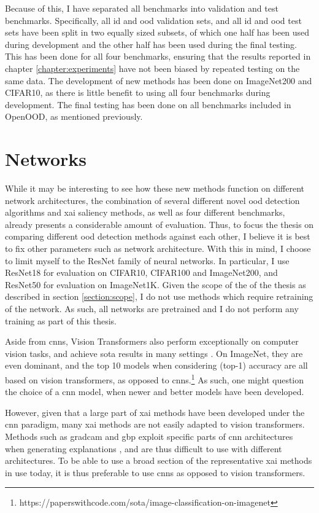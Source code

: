 \documentclass[UKenglish]{uiomasterthesis} %
\theoremstyle{definition}
\begin{document}
Because of this, I have separated all benchmarks into validation and test benchmarks. Specifically, all \ac{id} and \ac{ood} validation sets, and all \ac{id} and \ac{ood} test sets have been split in two equally sized subsets, of which one half has been used during development and the other half has been used during the final testing. This has been done for all four benchmarks, ensuring that the results reported in chapter \ref{chapter:experiments} have not been biased by repeated testing on the same data. The development of new methods has been done on ImageNet200 and CIFAR10, as there is little benefit to using all four benchmarks during development. The final testing has been done on all benchmarks included in OpenOOD, as mentioned previously.

\section{Networks}

While it may be interesting to see how these new methods function on different network architectures, the combination of several different novel \ac{ood} detection algorithms and \ac{xai} saliency methods, as well as four different benchmarks, already presents a considerable amount of evaluation. Thus, to focus the thesis on comparing different \ac{ood} detection methods against each other, I believe it is best to fix other parameters such as network architecture. With this in mind, I choose to limit myself to the ResNet \cite{resnet} family of neural networks. In particular, I use ResNet18 for evaluation on CIFAR10, CIFAR100 and ImageNet200, and ResNet50 for evaluation on ImageNet1K. Given the scope of the of the thesis as described in section \ref{section:scope}, I do not use methods which require retraining of the network. As such, all networks are pretrained and I do not perform any training as part of this thesis.

Aside from \acp{cnn}, Vision Transformers also perform exceptionally on computer vision tasks, and achieve \ac{sota} results in many settings \cite{vit}. On ImageNet, they are even dominant, and the top 10 models when considering (top-1) accuracy are all based on vision transformers, as opposed to \acp{cnn}.\footnote{https://paperswithcode.com/sota/image-classification-on-imagenet} As such, one might question the choice of a \ac{cnn} model, when newer and better models have been developed.

However, given that a large part of \ac{xai} methods have been developed under the \ac{cnn} paradigm, many \ac{xai} methods are not easily adapted to vision transformers. Methods such as \ac{gradcam} and \ac{gbp} exploit specific parts of \ac{cnn} architectures when generating explanations \cite{legrad}, and are thus difficult to use with different architectures. To be able to use a broad section of the representative \ac{xai} methods in use today, it is thus preferable to use \acp{cnn} as opposed to vision transformers.
\end{document}
